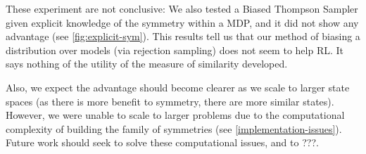 

These experiment are not conclusive: We also tested a Biased Thompson Sampler given explicit knowledge of the symmetry within a MDP,
and it did not show any advantage (see \ref{fig:explicit-sym}). This results tell us that our method of biasing a distribution over models (via rejection sampling)
does not seem to help RL. It says nothing of the utility of the measure of similarity developed.

Also, we expect the advantage should become clearer as we scale to larger state spaces (as there is more benefit to symmetry, there are more similar states).
However, we were unable to scale to larger problems due to the computational complexity of building the family of symmetries (see \ref{implementation-issues}).
Future work should seek to solve these computational issues, and to {\color{red}???}.
